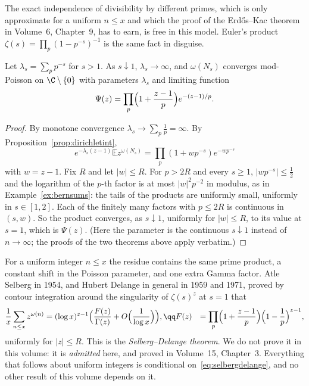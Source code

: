 The exact independence of divisibility by different primes, which is only approximate for a uniform $n\le x$ and which the proof of the Erd\H{o}s--Kac theorem in Volume~6, Chapter~9, has to earn, is free in this model. Euler's product
$\zeta(s)=\prod_p(1-p^{-s})^{-1}$ is the same fact in disguise.

\begin{theorem}\label{thm:omegamod}
Let $\lambda_s=\sum_pp^{-s}$ for $s>1$. As $s\downarrow1$, $\lambda_s\to\infty$, and $\omega(N_s)$ converges mod-Poisson on $\C\setminus\{0\}$ with parameters $\lambda_s$ and limiting function
\[
\Psi(z)=\prod_p\Bigl(1+\frac{z-1}p\Bigr)e^{-(z-1)/p}.
\]
\end{theorem}
\begin{proof}
By monotone convergence $\lambda_s\to\sum_p\frac1p=\infty$. By Proposition~\ref{prop:dirichletint},
\[
e^{-\lambda_s(z-1)}\mathbb Ez^{\omega(N_s)}=\prod_p(1+wp^{-s})e^{-wp^{-s}}
\]
with $w=z-1$. Fix $R$ and let $|w|\le R$. For $p>2R$ and every $s\ge1$,
$|wp^{-s}|\le\frac12$ and the logarithm of the $p$-th factor is at most $|w|^2p^{-2}$ in modulus, as in Example~\ref{ex:bernsums}: the tails of the products are uniformly small, uniformly in $s\in[1,2]$. Each of the finitely many factors with
$p\le2R$ is continuous in $(s,w)$. So the product converges, as $s\downarrow1$, uniformly for $|w|\le R$, to its value at $s=1$, which is $\Psi(z)$. (Here the parameter is the continuous $s\downarrow1$ instead of $n\to\infty$; the proofs of the
two theorems above apply verbatim.)
\end{proof}

For a uniform integer $n\le x$ the residue contains the same prime product, a constant shift in the Poisson parameter, and one extra Gamma factor. Atle Selberg in 1954, and Hubert Delange in general in 1959 and 1971, proved by contour integration around the singularity of $\zeta(s)^z$ at $s=1$ that
\begin{equation}\label{eq:selbergdelange}
\begin{aligned}\frac1x\sum_{n\le x}z^{\omega(n)}&=(\log x)^{z-1}\Bigl(\frac{F(z)}{\Gamma(z)}+O\Bigl(\frac1{\log x}\Bigr)\Bigr),\qq F(z)&=\prod_p\Bigl(1+\frac{z-1}p\Bigr)\Bigl(1-\frac1p\Bigr)^{z-1},\end{aligned}
\end{equation}
uniformly for $|z|\le R$. This is the \emph{Selberg--Delange theorem}. We do not prove it in this volume: it is \emph{admitted} here, and proved in
Volume~15, Chapter~3. Everything that follows about uniform integers is conditional on~\eqref{eq:selbergdelange}, and no other result of this volume depends on it.

